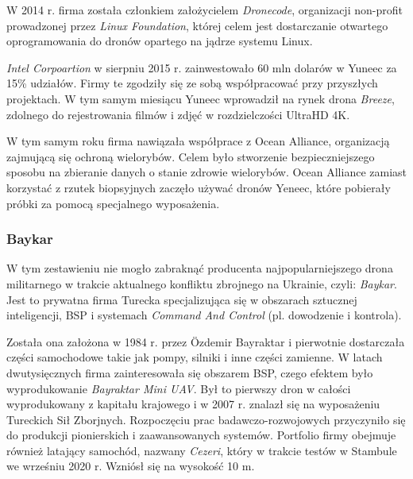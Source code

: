 W 2014 r. firma została członkiem założycielem \textit{Dronecode}, organizacji non-profit prowadzonej przez \textit{Linux Foundation}, której celem jest dostarczanie otwartego oprogramowania do dronów opartego na jądrze systemu Linux.

\textit{Intel Corpoartion} w sierpniu 2015 r. zainwestowało 60 mln dolarów w Yuneec za 15\% udziałów. Firmy te zgodziły się ze sobą współpracować przy przyszłych projektach. W tym samym miesiącu Yuneec wprowadził na rynek drona \textit{Breeze}, zdolnego do rejestrowania filmów i zdjęć w rozdzielczości UltraHD 4K.

W tym samym roku firma nawiązała współprace z Ocean Alliance, organizacją zajmującą się ochroną wielorybów. Celem było stworzenie bezpieczniejszego sposobu na zbieranie danych o stanie zdrowie wielorybów. Ocean Alliance zamiast korzystać z rzutek biopsyjnych zaczęło używać dronów Yeneec, które pobierały próbki za pomocą specjalnego wyposażenia. \cite{yuneec-wiki}

\subsubsection{Baykar}

\hspace{1cm}W tym zestawieniu nie mogło zabraknąć producenta najpopularniejszego drona militarnego w trakcie aktualnego konfliktu zbrojnego na Ukrainie, czyli: \textit{Baykar}. Jest to prywatna firma Turecka specjalizująca się w obszarach sztucznej inteligencji, BSP i systemach \textit{Command And Control} (pl. dowodzenie i kontrola).

Została ona założona w 1984 r. przez Özdemir Bayraktar i pierwotnie dostarczała części samochodowe takie jak pompy, silniki i inne części zamienne. W latach dwutysięcznych firma zainteresowała się obszarem BSP, czego efektem było wyprodukowanie \textit{Bayraktar Mini UAV}. Był to pierwszy dron w całości wyprodukowany z kapitału krajowego i w 2007 r. znalazł się na wyposażeniu Tureckich Sił Zborjnych. Rozpoczęciu prac badawczo-rozwojowych przyczyniło się do produkcji pionierskich i zaawansowanych systemów. Portfolio firmy obejmuje również latający samochód, nazwany \textit{Cezeri}, który w trakcie testów w Stambule we wrześniu 2020 r. Wzniósł się na wysokość 10 m.

